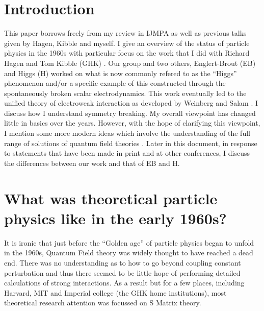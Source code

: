\documentclass[preprintnumbers,12pt]{revtex4-2}
\begin{document}
\section{Introduction}\label{sec:0}
%
This paper borrows freely from my review in IJMPA \cite{gg;2009} as
well as previous talks given by Hagen, Kibble and myself. I give an
overview of the status of particle physics in the 1960s with
particular focus on the work that I did with Richard Hagen and Tom
Kibble (GHK) \cite{ghk;1964}. Our group and two others, Englert-Brout
(EB) \cite{eb;1964} and Higgs (H) \cite{phpl;1964,ph;1964} worked on
what is now commonly refered to as the ``Higgs'' phenomenon and/or a
specific example of this constructed through the spontaneously broken
scalar electrodynamics. This work eventually led to the unified theory
of electroweak interaction as developed by Weinberg and Salam
\cite{sw;1967,as;1967}. I discuss how I understand symmetry
breaking. My overall viewpoint has changed little in basics over
the years. However, with the hope of clarifying this viewpoint, I mention some
more modern ideas which involve the understanding of the full range of
solutions of quantum field theories \cite{ggg;1996,ggzg;2007}. Later
in this document, in response to statements that have been made in
print and at other conferences, I discuss the differences between our
work and that of EB and H.
%
\section{What was theoretical particle physics like in the early 1960s?} \label{sec:1}
%
It is ironic that just before the ``Golden age'' of particle physics
began to unfold in the 1960s, Quantum Field theory was widely thought
to have reached a dead end. There was no understanding as to how to go
beyond coupling constant perturbation and thus there seemed to be
little hope of performing detailed calculations of strong interactions. As a result but
for a few places, including Harvard, MIT and Imperial college (the GHK
home institutions), most theoretical research attention was focussed
on S Matrix theory.
\end{document}
